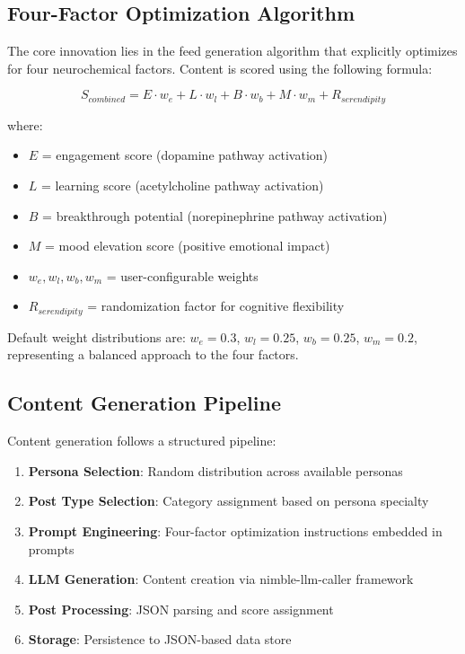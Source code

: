 \documentclass{article}
\begin{document}
\subsection{Four-Factor Optimization Algorithm}

The core innovation lies in the feed generation algorithm that explicitly optimizes for four neurochemical factors. Content is scored using the following formula:

\begin{equation}
S_{combined} = E \cdot w_e + L \cdot w_l + B \cdot w_b + M \cdot w_m + R_{serendipity}
\end{equation}

where:
\begin{itemize}
    \item $E$ = engagement score (dopamine pathway activation)
    \item $L$ = learning score (acetylcholine pathway activation)
    \item $B$ = breakthrough potential (norepinephrine pathway activation)
    \item $M$ = mood elevation score (positive emotional impact)
    \item $w_e, w_l, w_b, w_m$ = user-configurable weights
    \item $R_{serendipity}$ = randomization factor for cognitive flexibility
\end{itemize}

Default weight distributions are: $w_e = 0.3$, $w_l = 0.25$, $w_b = 0.25$, $w_m = 0.2$, representing a balanced approach to the four factors.

\subsection{Content Generation Pipeline}

Content generation follows a structured pipeline:

\begin{enumerate}
    \item \textbf{Persona Selection}: Random distribution across available personas
    \item \textbf{Post Type Selection}: Category assignment based on persona specialty
    \item \textbf{Prompt Engineering}: Four-factor optimization instructions embedded in prompts
    \item \textbf{LLM Generation}: Content creation via nimble-llm-caller framework
    \item \textbf{Post Processing}: JSON parsing and score assignment
    \item \textbf{Storage}: Persistence to JSON-based data store
\end{enumerate}
\end{document}
